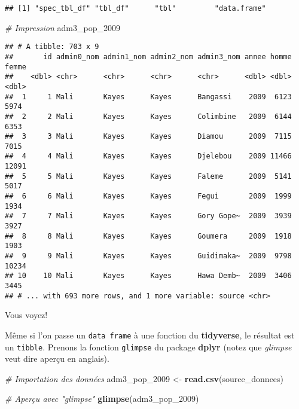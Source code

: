 \documentclass[]{book}
\newenvironment{Shaded}{\begin{snugshade}}{\end{snugshade}}
\newcommand{\KeywordTok}[1]{\textcolor[rgb]{0.13,0.29,0.53}{\textbf{#1}}}
\newcommand{\DecValTok}[1]{\textcolor[rgb]{0.00,0.00,0.81}{#1}}
\newcommand{\StringTok}[1]{\textcolor[rgb]{0.31,0.60,0.02}{#1}}
\newcommand{\CommentTok}[1]{\textcolor[rgb]{0.56,0.35,0.01}{\textit{#1}}}
\newcommand{\NormalTok}[1]{#1}
\begin{document}
\begin{verbatim}
## [1] "spec_tbl_df" "tbl_df"      "tbl"         "data.frame"
\end{verbatim}

\begin{Shaded}
\begin{Highlighting}[]
\CommentTok{# Impression}
\NormalTok{adm3_pop_}\DecValTok{2009}
\end{Highlighting}
\end{Shaded}

\begin{verbatim}
## # A tibble: 703 x 9
##       id admin0_nom admin1_nom admin2_nom admin3_nom annee homme femme
##    <dbl> <chr>      <chr>      <chr>      <chr>      <dbl> <dbl> <dbl>
##  1     1 Mali       Kayes      Kayes      Bangassi    2009  6123  5974
##  2     2 Mali       Kayes      Kayes      Colimbine   2009  6144  6353
##  3     3 Mali       Kayes      Kayes      Diamou      2009  7115  7015
##  4     4 Mali       Kayes      Kayes      Djelebou    2009 11466 12091
##  5     5 Mali       Kayes      Kayes      Faleme      2009  5141  5017
##  6     6 Mali       Kayes      Kayes      Fegui       2009  1999  1934
##  7     7 Mali       Kayes      Kayes      Gory Gope~  2009  3939  3927
##  8     8 Mali       Kayes      Kayes      Goumera     2009  1918  1903
##  9     9 Mali       Kayes      Kayes      Guidimaka~  2009  9798 10234
## 10    10 Mali       Kayes      Kayes      Hawa Demb~  2009  3406  3445
## # ... with 693 more rows, and 1 more variable: source <chr>
\end{verbatim}

Vous voyez!

Même si l'on passe un \texttt{data\ frame} à une fonction du
\textbf{tidyverse}, le résultat est un \texttt{tibble}. Prenons la
fonction \texttt{glimpse} du package \textbf{dplyr} (notez que
\emph{glimpse} veut dire aperçu en anglais).

\begin{Shaded}
\begin{Highlighting}[]
\CommentTok{# Importation des données}
\NormalTok{adm3_pop_}\DecValTok{2009}\NormalTok{ <-}\StringTok{ }\KeywordTok{read.csv}\NormalTok{(source_donnees)}

\CommentTok{# Aperçu avec "glimpse"}
\KeywordTok{glimpse}\NormalTok{(adm3_pop_}\DecValTok{2009}\NormalTok{)}
\end{Highlighting}
\end{Shaded}
\end{document}
